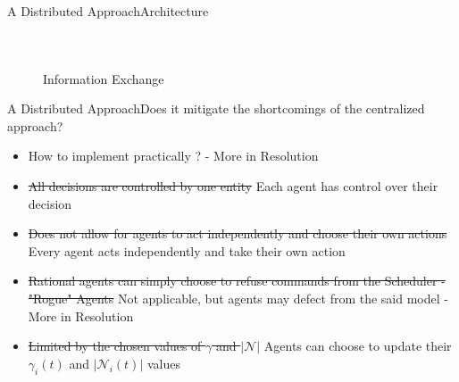 \documentclass[aspectratio=169]{beamer}
\begin{document}
\begin{frame}{A Distributed Approach}{Architecture}
\begin{columns}
\begin{figure}
\end{figure}
\end{columns}
\begin{figure}
        \caption{Information Exchange}
        \end{figure}
\end{frame}
\begin{frame}{A Distributed Approach}{Does it mitigate the shortcomings of the centralized approach?}
\begin{itemize}
    \item<5-> How to implement practically ? - More in Resolution
    \item<1-> \sout{All decisions are controlled by one entity} Each agent has control over their decision
    \item<2-> \sout{Does not allow for agents to act independently and choose their own actions} Every agent acts independently and take their own action
    \item<4-> \sout{Rational agents can simply choose to refuse commands from the Scheduler - "Rogue" Agents} Not applicable, but agents may defect from the said model - More in Resolution 
    \item<3-> \sout{Limited by the chosen values of $\gamma$ and $|\mathcal{N}|$} Agents can choose to update their $\gamma_i(t)$ and $|\mathcal{N}_i(t)|$ values
\end{itemize}
\end{frame}
\end{document}
